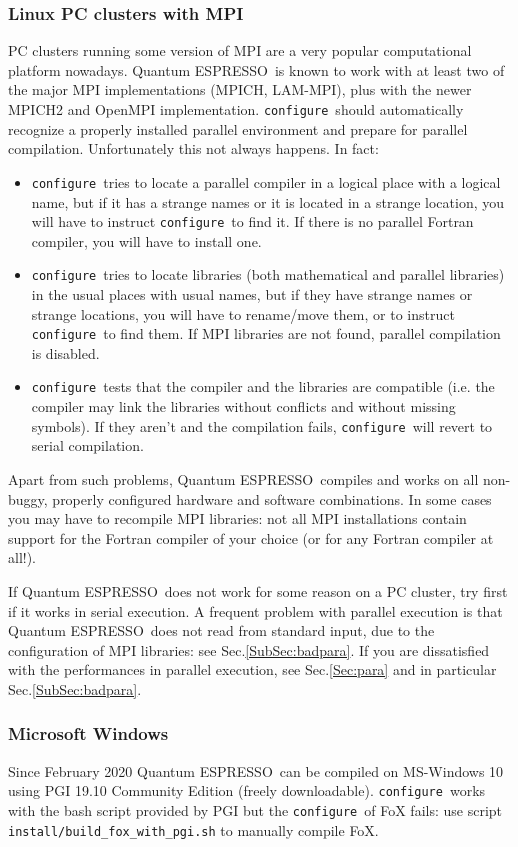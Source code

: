 \documentclass[12pt,a4paper]{article}
\def\qe{{\sc Quantum ESPRESSO}}
\def\configure{\texttt{configure}}
\begin{document}
\subsubsection{Linux PC clusters with MPI}
\label{SubSec:LinuxPCMPI}
PC clusters running some version of MPI are a very popular
computational platform nowadays. \qe\ is known to work
with at least two of the major MPI implementations (MPICH, LAM-MPI),
plus with the newer MPICH2 and OpenMPI implementation.
\configure\ should automatically recognize a properly installed
parallel environment and prepare for parallel compilation.
Unfortunately this not always happens. In fact:
\begin{itemize}
\item \configure\ tries to locate a parallel compiler in a logical
  place with a logical name, but if it has a strange names or it is
  located  in a strange location, you will have to instruct \configure\
  to find it. If there is no parallel Fortran compiler, you will have
  to install one.
\item \configure\ tries to locate libraries (both mathematical and
  parallel libraries) in the usual places with usual names, but if
  they have strange names or strange locations, you will have to
  rename/move them, or to instruct \configure\ to find them. If MPI
  libraries are not found,
  parallel compilation is disabled.
\item \configure\ tests that the compiler and the libraries are
  compatible (i.e. the compiler may link the libraries without
  conflicts and without missing symbols). If they aren't and the
  compilation fails, \configure\ will revert to serial compilation.
\end{itemize}

Apart from such problems, \qe\ compiles and works on all non-buggy, properly
configured hardware and software combinations. In some cases you may have to
recompile MPI libraries: not all MPI installations contain support for
the Fortran compiler of your choice (or for any Fortran compiler
at all!).

If \qe\ does not work for some reason on a PC cluster,
try first if it works in serial execution. A frequent problem with parallel
execution is that \qe\ does not read from standard input,
due to the configuration of MPI libraries: see Sec.\ref{SubSec:badpara}.
If you are dissatisfied with the performances in parallel execution,
see Sec.\ref{Sec:para} and in particular Sec.\ref{SubSec:badpara}.

\subsubsection{Microsoft Windows}
\label{SubSec:Windows}
Since February 2020 \qe\ can be compiled on MS-Windows 10 using PGI 19.10
Community Edition (freely downloadable). \configure\ works with the bash
script provided by PGI but the \configure\ of FoX fails: use script
\texttt{install/build\_fox\_with\_pgi.sh} to manually compile FoX.
\end{document}

